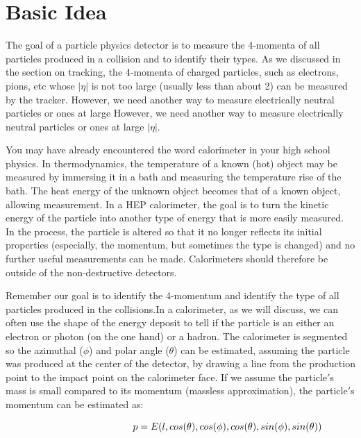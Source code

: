 \section{Basic Idea}

\noindent
The goal of a particle physics detector is to measure the 4-momenta of all particles produced in a collision and to identify their types.  As we discussed in the section on tracking, the 4-momenta of charged particles, such as electrons, pions, etc whose $\left | \eta  \right |$ is not too large (usually less than about 2) can be measured by the tracker. However, we need another way to measure electrically neutral particles or ones at large However, we need another way to measure electrically neutral particles or ones at large $\left | \eta  \right |$.

\;
\noindent
You may have already encountered the word calorimeter in your high school physics.  In thermodynamics, the temperature of a known (hot) object may be measured by immersing it in a bath and measuring the temperature rise of the bath.  The heat energy of the unknown object becomes that of a known object, allowing measurement. In a HEP calorimeter, the goal is to turn the kinetic energy of the particle into another type of energy that is more easily measured. In the process, the particle is altered so that it no longer reflects its initial properties (especially, the momentum, but sometimes the type is changed) and no further useful measurements can be made.  Calorimeters should therefore be outside of the non-destructive detectors.

\;
\noindent
Remember our goal is to identify the 4-momentum and identify the type of all particles produced in the collisions.In a calorimeter, as we will discuss, we can often use the shape of the energy deposit to tell if the particle is an either an electron or photon (on the one hand) or a hadron. The calorimeter is segmented so the azimuthal ($\phi$) and polar angle ($\theta$) can be estimated, assuming the particle was produced at the center of the detector, by drawing a line from the production point to the impact point on the calorimeter face. If we assume the particle$'$s mass is small compared to its momentum (massless approximation), the particle$'$s momentum can be estimated as:

\begin{equation}\hspace{34 mm}p = E(l,cos(\theta ),cos(\phi ),cos(\theta ),sin(\phi ),sin(\theta ))\end{equation}

